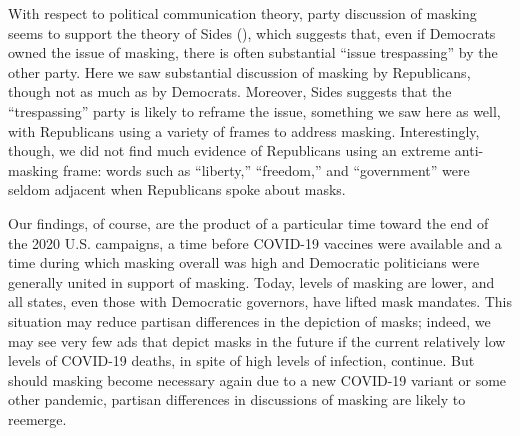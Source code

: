 With respect to political communication theory, party discussion of masking seems to support the theory of Sides (\citeyear{sides2006origins}), which suggests that, even if Democrats owned the issue of masking, there is often substantial ``issue trespassing'' by the other party. Here we saw substantial discussion of masking by Republicans, though not as much as by Democrats. Moreover, Sides suggests that the ``trespassing'' party is likely to reframe the issue, something we saw here as well, with Republicans using a variety of frames to address masking.  Interestingly, though, we did not find much evidence of Republicans using an extreme anti-masking frame: words such as ``liberty,'' ``freedom,'' and ``government'' were seldom adjacent when Republicans spoke about masks.

Our findings, of course, are the product of a particular time toward the end of the 2020 U.S. campaigns, a time before COVID-19 vaccines were available and a time during which masking overall was high and Democratic politicians were generally united in support of masking. Today, levels of masking are lower, and all states, even those with Democratic governors, have lifted mask mandates. This situation may reduce partisan differences in the depiction of masks; indeed, we may see very few ads that depict masks in the future if the current relatively low levels of COVID-19 deaths, in spite of high levels of infection, continue. But should masking become necessary again due to a new COVID-19 variant or some other pandemic, partisan differences in discussions of masking are likely to reemerge.

%
%
%
%

